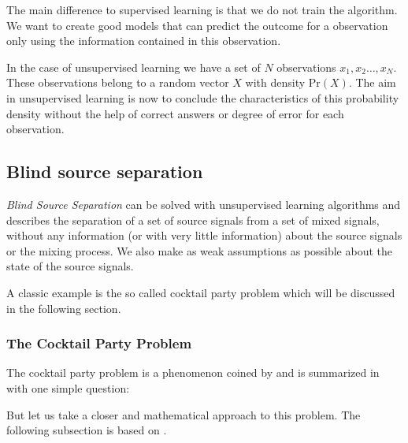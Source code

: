 \documentclass[12pt, a4paper]{article}
\numberwithin{equation}{section}
\numberwithin{figure}{section}
\numberwithin{table}{section}
\begin{document}
	The main difference to supervised learning is that we do not train the algorithm.
	We want to create good models that can predict the outcome for a observation only using the information contained in this observation.
	
	In the case of unsupervised learning we have a set of $N$ observations \mbox{$x_1,x_2\dots,x_N$}.
	These observations belong to a random vector $X$ with density \mbox{$\mathrm{Pr}(X)$}.
	The aim in unsupervised learning is now to conclude the characteristics of this probability density without the help of correct answers or degree of error for each observation.
	
	\subsection{Blind source separation} \label{blindsource}
	\textit{Blind Source Separation} can be solved with unsupervised learning algorithms and describes the separation of a set of source signals from a set of mixed signals, without any information (or with very little information) about the source signals or the mixing process. We also make as weak assumptions as possible about the state of the source signals. %
	
	A classic example is the so called cocktail party problem which will be discussed %
	in the following section.
	\subsubsection{The Cocktail Party Problem } \label{cocktailparty}%
	
	The cocktail party problem is a phenomenon coined by \citet{colincherry} and is summarized in \citet{general-article-cocktail-party-problem} with one simple question:
	\begin{center}
	\end{center}
	
	But let us take a closer and mathematical approach to this problem.
	The following subsection is based on \citet{elementsofstatisticallearning}.
	
\end{document}
